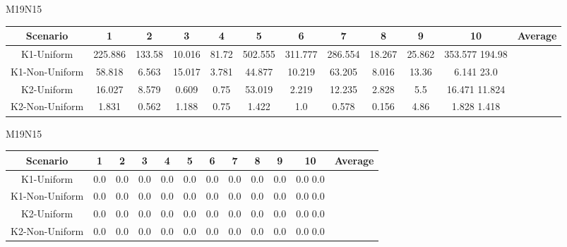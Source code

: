 \documentclass{article}
\begin{document}
\begin{table}
M19N15\\
\begin{tabular}{ |c|c|c|c|c|c|c|c|c|c|c|c| }
\hline
Scenario & 1 & 2 & 3 & 4 & 5 & 6 & 7 & 8 & 9 & 10 & Average\\
\hline
K1-Uniform & 225.886 & 133.58 & 10.016 & 81.72 & 502.555 & 311.777 & 286.554 & 18.267 & 25.862 & 353.577 194.98\\ \hline
K1-Non-Uniform & 58.818 & 6.563 & 15.017 & 3.781 & 44.877 & 10.219 & 63.205 & 8.016 & 13.36 & 6.141 23.0\\ \hline
K2-Uniform & 16.027 & 8.579 & 0.609 & 0.75 & 53.019 & 2.219 & 12.235 & 2.828 & 5.5 & 16.471 11.824\\ \hline
K2-Non-Uniform & 1.831 & 0.562 & 1.188 & 0.75 & 1.422 & 1.0 & 0.578 & 0.156 & 4.86 & 1.828 1.418\\ \hline
\end{tabular}
\end{table}

\begin{table}
M19N15\\
\begin{tabular}{ |c|c|c|c|c|c|c|c|c|c|c|c }
\hline
Scenario & 1 & 2 & 3 & 4 & 5 & 6 & 7 & 8 & 9 & 10 & Average\\
\hline
K1-Uniform & 0.0 & 0.0 & 0.0 & 0.0 & 0.0 & 0.0 & 0.0 & 0.0 & 0.0 & 0.0 0.0\\ \hline
K1-Non-Uniform & 0.0 & 0.0 & 0.0 & 0.0 & 0.0 & 0.0 & 0.0 & 0.0 & 0.0 & 0.0 0.0\\ \hline
K2-Uniform & 0.0 & 0.0 & 0.0 & 0.0 & 0.0 & 0.0 & 0.0 & 0.0 & 0.0 & 0.0 0.0\\ \hline
K2-Non-Uniform & 0.0 & 0.0 & 0.0 & 0.0 & 0.0 & 0.0 & 0.0 & 0.0 & 0.0 & 0.0 0.0\\ \hline
\end{tabular}
\end{table}
\end{document}
